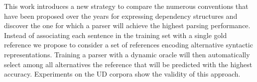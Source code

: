 This work introduces a new strategy to compare the numerous conventions that have been proposed over the years for expressing dependency structures and discover the one for which a parser will achieve the highest parsing performance. Instead of associating each sentence in the training set with a single gold reference we propose to consider a set of references encoding alternative syntactic representations. Training a parser with a dynamic oracle will then automatically select among all alternatives the reference that will be predicted with the highest accuracy. Experiments on the UD corpora show the validity of this approach.
